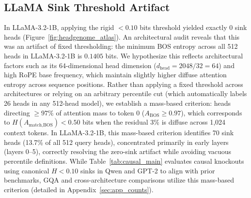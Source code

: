 \documentclass[11pt]{article}
\begin{document}
\subsection{LLaMA Sink Threshold Artifact}
In LLaMA-3.2-1B, applying the rigid $<0.10$ bits threshold yielded exactly 0 sink heads (Figure~\ref{fig:headgenome_atlas}). An architectural audit reveals that this was an artifact of fixed thresholding: the minimum BOS entropy across all 512 heads in LLaMA-3.2-1B is $0.1405$ bits. We hypothesize this reflects architectural factors such as its 64-dimensional head dimension ($d_{\text{head}} = 2048 / 32 = 64$) and high RoPE base frequency, which maintain slightly higher diffuse attention entropy across sequence positions. Rather than applying a fixed threshold across architectures or relying on an arbitrary percentile cut (which automatically labels 26 heads in any 512-head model), we establish a mass-based criterion: heads directing $\ge 97\%$ of attention mass to token 0 ($A_{\text{BOS}} \ge 0.97$), which corresponds to $H(A_{\text{match}, \text{BOS}}) < 0.50$ bits when the residual $3\%$ is diffuse across 1,024 context tokens. In LLaMA-3.2-1B, this mass-based criterion identifies 70 sink heads (13.7\% of all 512 query heads), concentrated primarily in early layers (layers 0--5), correctly resolving the zero-sink artifact while avoiding vacuous percentile definitions. While Table~\ref{tab:causal_main} evaluates causal knockouts using canonical $H < 0.10$ sinks in Qwen and GPT-2 to align with prior benchmarks, GQA and cross-architecture comparisons utilize this mass-based criterion (detailed in Appendix~\ref{sec:app_counts}).
\end{document}
